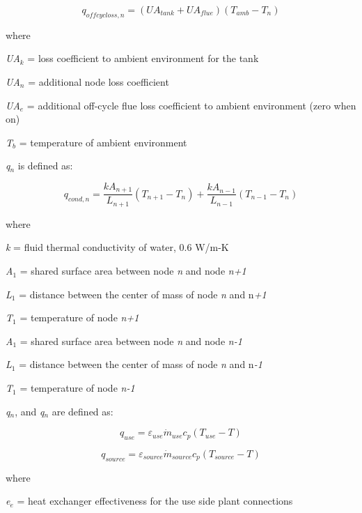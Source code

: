 \begin{equation}
{q_{offcycloss,n}} = ({UA_{tank} + UA_{flue}})({T_{amb}} - {T_n})
\end{equation}

where

\emph{UA\(_{k}\)} = loss coefficient to ambient environment for the tank

\emph{UA\(_{n}\)} = additional node loss coefficient

\emph{UA\(_{e}\)} = additional off-cycle flue loss coefficient to ambient environment (zero when on)

\emph{T\(_{b}\)} = temperature of ambient environment

\emph{q\(_{n}\)} is defined as:

\begin{equation}
{q_{cond,n}} = \frac{{k{A_{n + 1}}}}{{{L_{n + 1}}}}({T_{n + 1}} - {T_n}) + \frac{{k{A_{n - 1}}}}{{{L_{n - 1}}}}({T_{n - 1}} - {T_n})
\end{equation}

where

\emph{k} = fluid thermal conductivity of water, 0.6 W/m-K

\emph{A\(_{1}\)} = shared surface area between node \emph{n} and node \emph{n+1}

\emph{L\(_{1}\)} = distance between the center of mass of node \emph{n} and n\emph{+1}

\emph{T\(_{1}\)} = temperature of node \emph{n+1}

\emph{A\(_{1}\)} = shared surface area between node \emph{n} and node \emph{n-1}

\emph{L\(_{1}\)} = distance between the center of mass of node \emph{n} and n\emph{-1}

\emph{T\(_{1}\)} = temperature of node \emph{n-1}

\emph{q\(_{n}\)}, and \emph{q\(_{n}\)} are defined as:

\begin{equation}
{q_{use}} = {\varepsilon_{use}}{\dot m_{use}}{c_p}\left( {{T_{use}} - T} \right)
\end{equation}

\begin{equation}
{q_{source}} = {\varepsilon_{source}}{\dot m_{source}}{c_p}\left( {{T_{source}} - T} \right)
\end{equation}

where

\emph{e\(_{e}\)} = heat exchanger effectiveness for the use side plant connections

